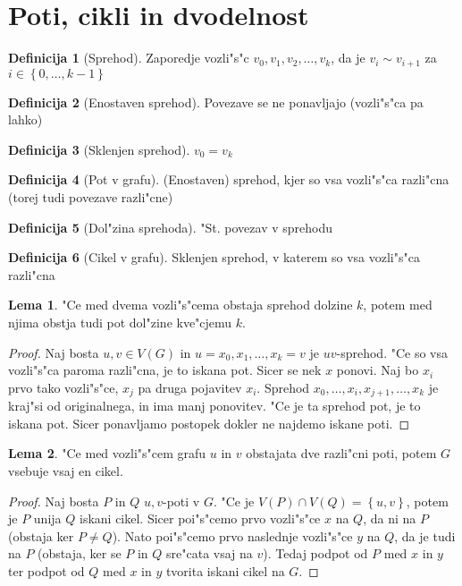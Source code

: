 \documentclass{article}
\theoremstyle{definition}
\newtheorem{definition}{Definicija}[section]
\newtheorem{lemma}{Lema}[section]
\begin{document}
\section{Poti, cikli in dvodelnost}
	\begin{definition}[Sprehod]
		Zaporedje vozli"s"c $v_0,v_1,v_2,\ldots,v_k$, da je $v_i \sim v_{i+1}$ za $i \in \left\lbrace 0, \ldots, k-1 \right\rbrace $ 
	\end{definition}
	\begin{definition}[Enostaven sprehod]
		Povezave se ne ponavljajo (vozli"s"ca pa lahko)
	\end{definition}
	\begin{definition}[Sklenjen sprehod]
		$v_0 = v_k$
	\end{definition}
	\begin{definition}[Pot v grafu]
		(Enostaven) sprehod, kjer so vsa vozli"s"ca razli"cna (torej tudi povezave razli"cne)
	\end{definition}
	\begin{definition}[Dol"zina sprehoda]
		"St. povezav v sprehodu
	\end{definition}
	\begin{definition}[Cikel v grafu]
		Sklenjen sprehod, v katerem so vsa vozli"s"ca razli"cna
	\end{definition}

	\begin{lemma}
		"Ce med dvema vozli"s"cema obstaja sprehod dolzine $k$, potem med njima obstja tudi pot dol"zine kve"cjemu $k$.
		\begin{proof}
			Naj bosta $u,v \in V(G)$ in $u=x_0,x_1,\ldots,x_k=v$ je $uv$-sprehod. "Ce so vsa vozli"s"ca paroma razli"cna, je to iskana pot. Sicer se nek $x$ ponovi. Naj bo $x_i$ prvo tako vozli"s"ce, $x_j$ pa druga pojavitev $x_i$. Sprehod $x_0, \ldots, x_i, x_{j+1}, \ldots, x_k$ je kraj"si od originalnega, in ima manj ponovitev. "Ce je ta sprehod pot, je to iskana pot. Sicer ponavljamo postopek dokler ne najdemo iskane poti.
		\end{proof}
	\end{lemma}
	
	\begin{lemma}
		"Ce med vozli"s"cem grafu $u$ in $v$ obstajata dve razli"cni poti, potem $G$ vsebuje vsaj en cikel.
		\begin{proof}
			Naj bosta $P$ in $Q$ $u,v$-poti v $G$. "Ce je $V(P) \cap V(Q) = \left\lbrace u,v\right\rbrace$, potem je $P$ unija $Q$ iskani cikel. Sicer poi"s"cemo prvo vozli"s"ce $x$ na $Q$, da ni na $P$ (obstaja ker $P \neq Q$). Nato poi"s"cemo prvo naslednje vozli"s"ce $y$ na $Q$, da je tudi na $P$ (obstaja, ker se $P$ in $Q$ sre"cata vsaj na $v$). Tedaj podpot od $P$ med $x$ in $y$ ter podpot od $Q$ med $x$ in $y$ tvorita iskani cikel na $G$.
		\end{proof}
	\end{lemma}
	
\end{document}
